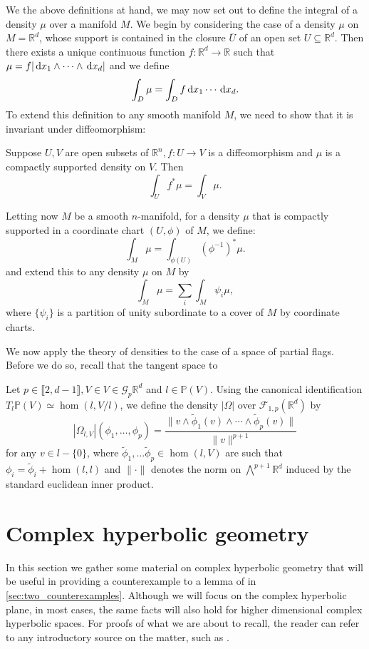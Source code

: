 \documentclass{report}
\begin{document}
We the above definitions at hand, we may now set out to define the integral of a density $\mu$ over a manifold $M$.
We begin by considering the case of a density $\mu$ on $M = \mathbb R^d$, whose support is contained in the closure $\overline{U}$ of an open set $U \subseteq \mathbb R^d$.
Then there exists a unique continuous function $f: \mathbb R^d \to \mathbb R$ such that $\mu = f |\,\mathrm{d} x_1 \wedge \cdots \wedge \,\mathrm{d} x_d|$ and we define
\[
\int_D \mu = \int_D f \,\mathrm{d} x_1 \cdots \,\mathrm{d} x_d.
\]
To extend this definition to any smooth manifold $M$, we need to show that it is invariant under diffeomorphism:
\begin{proposition}
    Suppose $U, V$ are open subsets of $\mathbb R^n, f: U \to V$ is a diffeomorphism and $\mu$ is a compactly supported density on $V$.
    Then
    \[
    \int_U f^*\mu = \int_V \mu.
    \]
\end{proposition}
Letting now $M$ be a smooth $n$-manifold, for a density $\mu$ that is compactly supported in a coordinate chart $(U, \phi)$ of $M$, we define:
\[
\int_M \mu = \int_{\phi(U)} (\phi^{-1})^*\mu.
\]
and extend this to any density $\mu$ on $M$ by
\[
\int_M \mu = \sum_{i} \int_M \psi_i \mu,
\]
where $\{\psi_i\}$ is a partition of unity subordinate to a cover of $M$ by coordinate charts.

We now apply the theory of densities to the case of a space of partial flags.
Before we do so, recall that the tangent space to 
\begin{example}
    Let $p \in \llbracket 2, d-1 \rrbracket, V \in V \in \mathcal G_{p}{\mathbb R^d}$ and $l \in \mathbb P(V)$.
        Using the canonical identification $T_l \mathbb P(V) \simeq \hom (l, V/l)$, we define the density $|\Omega|$ over $\mathcal F_{1, p}(\mathbb R^d)$ by
    \[
        |\Omega_{l,V}|(\phi_1, \ldots, \phi_p) = 
        \frac{\| v \wedge \tilde \phi_1(v) \wedge \cdots \wedge \tilde \phi_p (v) \|}{\|v\|^{p+1}}
    \]
    for any $v \in l - \{ 0\}$, where $\tilde \phi_1, \ldots \tilde \phi_p \in \hom(l, V)$ are such that $\phi_i = \tilde \phi_i + \hom(l, l)$ and $\| \cdot \|$ denotes the norm on $\bigwedge^{p+1} \mathbb R^d$ induced by the standard euclidean inner product.
\end{example}


\section{Complex hyperbolic geometry}\label{sec:complex_geometry}
In this section we gather some material on complex hyperbolic geometry that will be useful in providing a counterexample to a lemma of \cite{pozzetti_anosov_2023} in \cref{sec:two_counterexamples}.
Although we will focus on the complex hyperbolic plane, in most cases, the same facts will also hold for higher dimensional complex hyperbolic spaces.
For proofs of what we are about to recall, the reader can refer to any introductory source on the matter, such as \cite{parker2003notes}.
\end{document}
